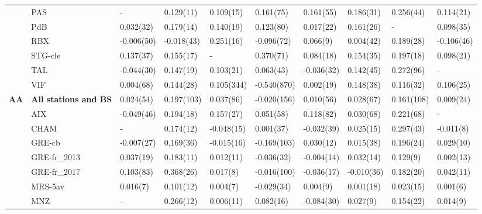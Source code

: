 \documentclass[acp]{copernicus}
\begin{document}
\begin{table}
\begin{tabular}{llllllllll}
                 & PAS                          & -           & 0.129(11)  & 0.109(15)  & 0.161(75)   & 0.161(55)  & 0.186(31)   & 0.256(44)  & 0.114(21)\\
                 & PdB                          & 0.032(32)   & 0.179(14)  & 0.140(19)  & 0.123(80)   & 0.017(22)  & 0.161(26)   & -          & 0.098(35)\\
                 & RBX                          & -0.006(50)  & -0.018(43) & 0.251(16)  & -0.096(72)  & 0.066(9)   & 0.004(42)   & 0.189(28)  & -0.106(46)\\
                 & STG-cle                      & 0.137(37)   & 0.155(17)  & -          & 0.370(71)   & 0.084(18)  & 0.154(35)   & 0.197(18)  & 0.098(21)\\
                 & TAL                          & -0.044(30)  & 0.147(19)  & 0.103(21)  & 0.063(43)   & -0.036(32) & 0.142(45)   & 0.272(96)  & -\\
                 & VIF                          & 0.004(68)   & 0.144(28)  & 0.105(344) & -0.540(870) & 0.002(19)  & 0.148(38)   & 0.116(32)  & 0.106(25)\\
\textbf{AA}      & \textbf{All stations and BS} & 0.024(54)   & 0.197(103) & 0.037(86)  & -0.020(156) & 0.010(56)  & 0.028(67)   & 0.161(108) & 0.009(24)\\
                 & AIX                          & -0.049(46)  & 0.194(18)  & 0.157(27)  & 0.051(58)   & 0.118(82)  & 0.030(68)   & 0.221(68)  & -\\
                 & CHAM                         & -           & 0.174(12)  & -0.048(15) & 0.001(37)   & -0.032(39) & 0.025(15)   & 0.297(43)  & -0.011(8)\\
                 & GRE-cb                       & -0.007(27)  & 0.169(36)  & -0.015(16) & -0.169(103) & 0.030(12)  & 0.015(38)   & 0.196(24)  & 0.029(10)\\
                 & GRE-fr\_2013                 & 0.037(19)   & 0.183(11)  & 0.012(11)  & -0.036(32)  & -0.004(14) & 0.032(14)   & 0.129(9)   & 0.002(13)\\
                 & GRE-fr\_2017                 & 0.103(83)   & 0.368(26)  & 0.017(8)   & -0.016(100) & -0.036(17) & -0.010(36)  & 0.182(20)  & 0.042(11)\\
                 & MRS-5av                      & 0.016(7)    & 0.101(12)  & 0.004(7)   & -0.029(34)  & 0.004(9)   & 0.001(18)   & 0.023(15)  & 0.001(6)\\
                 & MNZ                          & -           & 0.266(12)  & 0.006(11)  & 0.082(16)   & -0.084(30) & 0.027(9)    & 0.154(22)  & 0.014(9)\\

\end{tabular}
\end{table}
\end{document}
